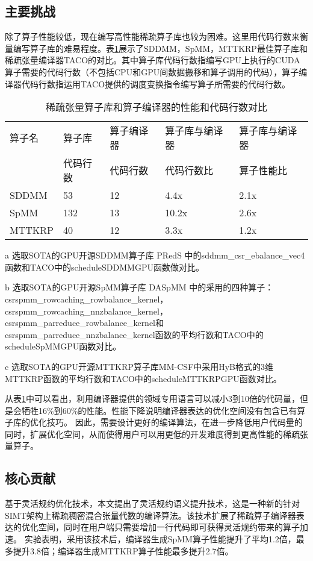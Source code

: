 \subsection{主要挑战}
除了算子性能较低，现在编写高性能稀疏算子库也较为困难。这里用代码行数来衡量编写算子库的难易程度。表\ref{tab:motivation-2}展示了SDDMM，SpMM，MTTKRP最佳算子库和稀疏张量编译器TACO的对比。其中算子库代码行数指编写GPU上执行的CUDA算子需要的代码行数（不包括CPU和GPU间数据搬移和算子调用的代码），算子编译器代码行数指运用TACO提供的调度变换指令编写算子所需要的代码行数。
\begin{table}
  \centering
  \begin{threeparttable}[c]
  \caption{稀疏张量算子库和算子编译器的性能和代码行数对比}
  \label{tab:motivation-2}
  \begin{tabular}{lllll}
    \toprule
    算子名  & 算子库 & 算子编译器 & 算子库与编译器 & 算子库与编译器   \\
           & 代码行数 & 代码行数 & 代码行数比    & 算子性能比       \\
    \midrule
    SDDMM\tnote{a}  & 53 & 12 & 4.4x & 2.1x \\
    SpMM\tnote{b}   & 132 & 13 & 10.2x & 2.6x \\
    MTTKRP\tnote{c} & 40 & 12 & 3.3x & 1.2x \\
    \bottomrule
  \end{tabular}
  \begin{tablenotes}
    \item [a] 选取SOTA的GPU开源SDDMM算子库 PRedS \cite{yu2021exploiting}中的sddmm\_csr\_ebalance\_vec4函数和TACO中的scheduleSDDMMGPU函数做对比。
    \item [b] 选取SOTA的GPU开源SpMM算子库 DASpMM \cite{dai2022heuristic}中的采用的四种算子：csrspmm\_rowcaching\_rowbalance\_kernel，
      csrspmm\_rowcaching\_nnzbalance\_kernel，csrspmm\_parreduce\_rowbalance\_kernel和csrspmm\_parreduce\_nnzbalance\_kernel函数的平均行数和TACO中的scheduleSpMMGPU函数对比。
    \item [c] 选取SOTA的GPU开源MTTKRP算子库MM-CSF\cite{nisa2019mttkrp}中采用HyB格式的3维MTTKRP函数的平均行数和TACO中的scheduleMTTKRPGPU函数对比。
  \end{tablenotes}
  \end{threeparttable}
\end{table}
从表\ref{tab:motivation-2}中可以看出，利用编译器提供的领域专用语言可以减小3到10倍的代码量，但是会牺牲16\%到60\%的性能。性能下降说明编译器表达的优化空间没有包含已有算子库的优化技巧。
因此，需要设计更好的编译算法，在进一步降低用户代码量的同时，扩展优化空间，从而使得用户可以用更低的开发难度得到更高性能的稀疏张量算子。
\subsection{核心贡献}
基于灵活规约优化技术，本文提出了灵活规约语义提升技术，这是一种新的针对SIMT架构上稀疏稠密混合张量代数的编译算法。该技术扩展了稀疏算子编译器表达的优化空间，同时在用户端只需要增加一行代码即可获得灵活规约带来的算子加速。
实验表明，采用该技术后，编译器生成SpMM算子性能提升了平均1.2倍，最多提升3.8倍；编译器生成MTTKRP算子性能最多提升2.7倍。

